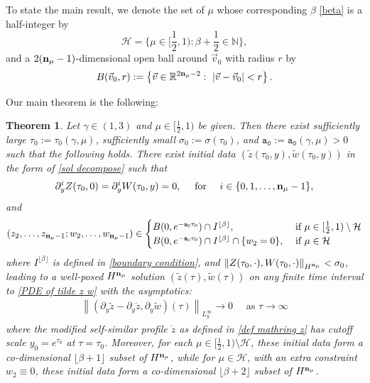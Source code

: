 \documentclass{article}
\newcommand{\norm}[1]{\left\lVert#1\right\rVert}
\newcommand{\ga}{\gamma}
\newcommand{\pa}{\partial}
\def\be{\begin{equation}}
\def\ee{\end{equation}}
\def\beqa{\begin{equation}\begin{aligned}}
\def\eeqa{\end{aligned}\end{equation}}
\def\espz{Z}
\def\espw{W}
\def\epzero{\mathtt{a_0}}
\def\ndmu{{\bf{n}_{\mu}}}
\numberwithin{equation}{section}
\newtheorem{theorem}{Theorem}[section]
\begin{document}
To state the main result, we denote the set of $\mu$ whose corresponding $\beta$ \eqref{beta} is a half-integer by 
\be
\mathcal H = \big\{\mu\in[\frac12,1): \beta+\frac12 \in \mathbb N\big\}, 
\ee 
and 
a $2(\ndmu-1)$-dimensional open ball around $\vec v_0$ with radius $r$ by 
\be\label{set B}
    B(\vec v_0,r):=\left\{\vec v\in\mathbb R^{2\ndmu-2}: \ \left|\vec v-\vec v_0 \right| < r  \right\}.
\ee


Our main theorem is the following: 
\begin{theorem}\label{thm 4.1}
     Let $\ga\in(1,3)$ and $\mu\in[\frac12,1)$ be given. 
     Then there exist sufficiently large $\tau_0:=\tau_0(\ga,\mu)$, 
     sufficiently small $\sigma_0:=\sigma(\tau_0)$,
     and $\epzero:=\epzero(\ga,\mu)>0$   such that the following
     holds. There exist initial data $(\tilde z(\tau_0,y), \tilde w(\tau_0,y))$ in the form of \eqref{sol decompose}
     such that 
     \[\pa_y^i \espz(\tau_0,0)=\pa_y^i\espw(\tau_0,y)=0,\quad \text{ for } \quad i\in\{0,1,\dots,\ndmu-1\},\]
     and
     \be\label{initialziwi}
     (z_2, \dots, z_{\ndmu-1}; w_2,\dots, w_{\ndmu-1}) \in 
     \begin{cases}
     B(0,e^{-\epzero \tau_0})\cap I^{\lfloor \beta \rfloor}, & \text{ if } \mu \in [\frac12,1)\setminus \mathcal H \\
     B(0,e^{-\epzero \tau_0})\cap I^{\lfloor \beta \rfloor}\cap \{w_2=0\},&
     \text{ if } \mu \in \mathcal H 
     \end{cases}
     \ee 
     where $I^{\lfloor \beta \rfloor}$ is defined in \eqref{boundary condition}, and $\norm{\espz(\tau_0,\cdot),\espw(\tau_0,\cdot)}_{H^{\ndmu}}< \sigma_0$,  leading to a well-posed $H^{\ndmu}$  
     solution $(\tilde z(\tau),\tilde w(\tau))$ on any finite time interval 
     to \eqref{PDE of tilde z w} 
     with the asymptotics:
      \beqa\label{decay fact}
        \norm{(\pa_y\tilde z-\pa_y\mathring z,\pa_y\tilde w)(\tau)}_{L^\infty_y} \to 0 \quad \text{ as } \tau\to \infty
     \eeqa
     where the modified self-similar profile $\mathring z$ as defined in \eqref{def mathring z} has cutoff scale $y_0=e^{\tau_0}$ at $\tau=\tau_0$. 
    Moreover, 
    for each $\mu\in[\frac12,1)\setminus \mathcal H$, these initial data form a co-dimensional $\lfloor \beta+1 \rfloor$ subset of $H^\ndmu$, while for $\mu\in \mathcal H$, with an extra constraint $w_2\equiv0$, these initial data form a co-dimensional $\lfloor \beta+2 \rfloor$ subset of $H^\ndmu$.   
\end{theorem}
\end{document}
